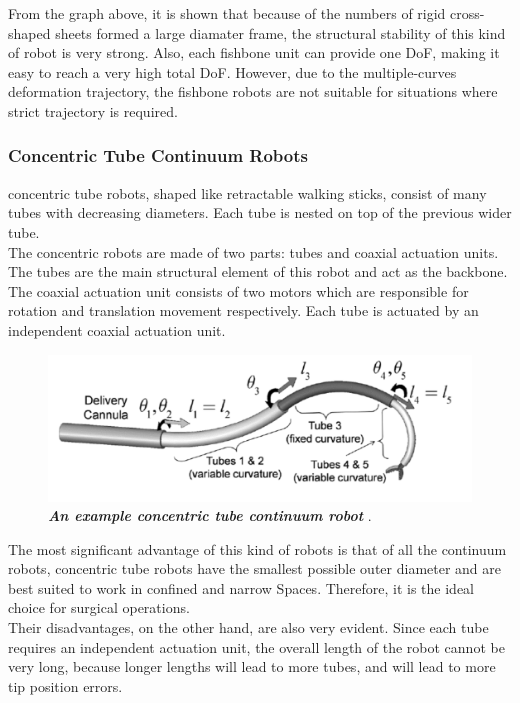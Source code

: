 \noindent From the graph above, it is shown that because of the numbers of rigid cross-shaped sheets formed a large diamater 
frame, the structural stability of this kind of robot is very strong. Also, each fishbone unit can provide one DoF, making it 
easy to reach a very high total DoF. However, due to the multiple-curves deformation trajectory, the fishbone robots are not 
suitable for situations where strict trajectory is required\cite{fishboneCR}.
\subsubsection{Concentric Tube Continuum Robots}
concentric tube robots, shaped like retractable walking sticks, consist of many tubes with decreasing diameters. Each tube is 
nested on top of the previous wider tube.  \\
The concentric robots are made of two parts: tubes and coaxial actuation units. The tubes are the main structural element of 
this robot and act as the backbone. The coaxial actuation unit consists of two motors which are responsible for rotation and 
translation movement respectively. Each tube is actuated by an independent coaxial actuation unit. 
\begin{figure}[H] %
    \centering %
    \captionsetup{labelsep=colon}
    \includegraphics[width=.9\textwidth]{Image/LR/concentric_tube_CR.PNG} 
    \caption[An example concentric tube continuum robot]
    {\centering \textit{\textbf{An example concentric tube continuum robot}} \cite{CTCR_example}.}
    \label{fig:CTCR_example}
\end{figure}
\noindent The most significant advantage of this kind of robots is that of all the continuum robots, concentric tube robots have the 
smallest possible outer diameter and are best suited to work in confined and narrow Spaces. Therefore, it is the ideal choice 
for surgical operations. \\
Their disadvantages, on the other hand, are also very evident. Since each tube requires an independent actuation unit, the 
overall length of the robot cannot be very long, because longer lengths will lead to more tubes, and will lead to more tip 
position errors.



\newpage